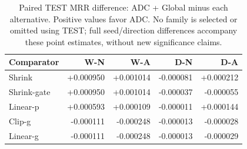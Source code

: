 \begin{table}[htbp]
\centering\footnotesize
\setlength{\tabcolsep}{4pt}
\caption{Paired TEST MRR difference: ADC + Global minus each alternative. Positive values favor ADC. No family is selected or omitted using TEST; full seed/direction differences accompany these point estimates, without new significance claims.}
\label{tab:matched-paired}
\begin{tabular}{lrrrr}
\toprule
Comparator & W-N & W-A & D-N & D-A\\
\midrule
Shrink & +0.000950 & +0.001014 & -0.000081 & +0.000212\\
Shrink-gate & +0.000950 & +0.001014 & -0.000037 & -0.000055\\
Linear-p & +0.000593 & +0.000109 & -0.000011 & +0.000144\\
Clip-g & -0.000111 & -0.000248 & -0.000013 & -0.000028\\
Linear-g & -0.000111 & -0.000248 & -0.000013 & -0.000029\\
\bottomrule
\end{tabular}
\end{table}
